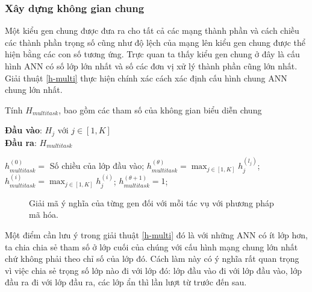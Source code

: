 \subsubsection{Xây dựng không gian chung}
Một kiểu gen chung được đưa ra cho tất cả các mạng thành phần và cách chiều các thành phần trọng số cũng như độ lệch của mạng lên kiểu gen chung được thể hiện bằng các con số tương ứng.
Trực quan ta thấy kiểu gen chung ở đây là cấu hình ANN có số lớp lớn nhất và số các đơn vị xử lý thành phần cũng lớn nhất. Giải thuật \ref{h-multi} \cite{nqtuan} thực hiện chính xác cách xác định cấu hình chung ANN chung lớn nhất.
\begin{algorithm} [h!]
    \caption{Tính $H_{multitask}$, bao gồm các tham số của không gian biểu diễn chung}
    \textbf{Đầu vào}: $H_j$ với $j \in [1, K]$\\
    \textbf{Đầu ra}: $H_{multitask}$
    \begin{algorithmic}[1]
        \State $h_{multitask}^{(0)} = $ Số chiều của lớp đầu vào;
        \State $h_{multitask}^{(\theta)} = \max_{j \in [1, K]} h_j^{(l_j)}$;
            \State $h_{multitask}^{(i)} = \max_{j \in [1, K]}{h_j^{(i)}}$;
        \State $h_{multitask}^{(\theta + 1)} = 1$;
        \State
    \end{algorithmic}
    \label{h-multi}
\end{algorithm}

\begin{figure}[h!]
    \centering
    \caption{Giải mã ý nghĩa của từng gen đối với mỗi tác vụ với phương pháp mã hóa.}
    \label{fig:decode}
\end{figure}

Một điểm cần lưu ý trong giải thuật \ref{h-multi} đó là với những ANN có ít lớp hơn, ta chia chia sẻ tham số ở lớp cuối của chúng với cấu hình mạng chung lớn nhất chứ không phải theo chỉ số của lớp đó. Cách làm này có ý nghĩa rất quan trọng vì việc chia sẻ trọng số lớp nào đi với lớp đó: lớp đầu vào đi với lớp đầu vào, lớp đầu ra đi với lớp đầu ra, các lớp ẩn thì lần lượt từ trước đến sau. 

